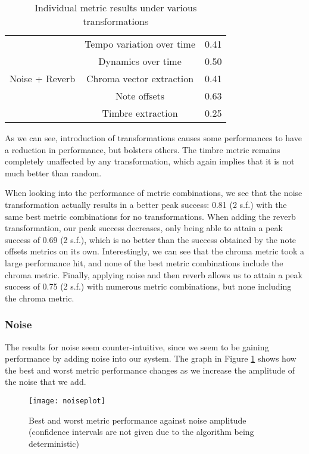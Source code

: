 \documentclass[oneside, class=book, 12pt, crop=false]{standalone}
\begin{document}
\begin{table}[h]
\begin{tabular}{c|cc}
        \multirow{5}{*}{Noise + Reverb} & Tempo variation over time & 0.41 \\ \cline{2-3}
                                &Dynamics over time & 0.50 \\ \cline{2-3}
                                &Chroma vector extraction & 0.41 \\ \cline{2-3}
                                &Note offsets &  0.63\\ \cline{2-3}
                                &Timbre extraction & 0.25 \\ 
        
    \end{tabular}
    \caption{Individual metric results under various transformations}
    \label{table:transformation results}
\end{table}



As we can see, introduction of transformations causes some performances to have a reduction in performance, but bolsters others. The timbre metric remains completely unaffected by any transformation, which again implies that it is not much better than random.

When looking into the performance of metric combinations, we see that the noise transformation actually results in a better peak success: 0.81 (2 s.f.) with the same best metric combinations for no transformations. When adding the reverb transformation, our peak success decreases, only being able to attain a peak success of 0.69 (2 s.f.), which is no better than the success obtained by the note offsets metrics on its own. Interestingly, we can see that the chroma metric took a large performance hit, and none of the best metric combinations include the chroma metric. Finally, applying noise and then reverb allows us to attain a peak success of 0.75 (2 s.f.) with numerous metric combinations, but none including the chroma metric.

\subsubsection{Noise}

The results for noise seem counter-intuitive, since we seem to be gaining performance by adding noise into our system. The graph in Figure \ref{fig:noiseplot} shows how the best and worst metric performance changes as we increase the amplitude of the noise that we add.

\begin{figure}[h]
    \captionsetup{justification=centering}
    \centering
    \texttt{[image: noiseplot]}
    \caption{Best and worst metric performance against noise amplitude (confidence intervals are not given due to the algorithm being deterministic)}
    \label{fig:noiseplot}
\end{figure}
\end{document}
